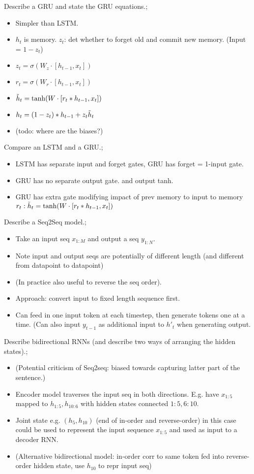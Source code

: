 \documentclass{article}
\begin{document}
Describe a GRU and state the GRU equations.; \begin{itemize}
    \item Simpler than LSTM. 
    \item $h_t$ is memory. $z_t$: det whether to forget old and commit new memory. (Input = $1-z_t$)
    \item $z_t = \sigma(W_z \cdot [h_{t-1}, x_t])$
    \item $r_t = \sigma(W_r \cdot [h_{t-1}, x_t])$
    \item $\Tilde{h}_t = \tanh(W\cdot [r_t * h_{t-1}, x_t])$
    \item $h_t = (1-z_t)*h_{t-1} + z_t \Tilde{h}_t$
    \item (todo: where are the biases?)
\end{itemize}

Compare an LSTM and a GRU.; \begin{itemize}
    \item LSTM has separate input and forget gates, GRU has forget = 1-input gate.
    \item GRU has no separate output gate. and output tanh.
    \item GRU has extra gate modifying impact of prev memory to input to memory $r_t: \Tilde{h}_t = \tanh(W\cdot [r_t * h_{t-1}, x_t])$
\end{itemize}

Describe a Seq2Seq model.; \begin{itemize}
    \item Take an input seq $x_{1:M}$ and output a seq $y_{1:N}$. 
    \item Note input and output seqs are potentially of different length (and different from datapoint to datapoint)
    \item (In practice also useful to reverse the seq order).
    \item Approach: convert input to fixed length sequence first.
    \item Can feed in one input token at each timestep, then generate tokens one at a time. (Can also input $y_{t-1}$ as additional input to $h'_t$ when generating output.
\end{itemize}

Describe bidirectional RNNs (and describe two ways of arranging the hidden states).; \begin{itemize}
    \item (Potential criticism of Seq2seq: biased towards capturing latter part of the sentence.)
    \item Encoder model traverses the input seq in both directions. E.g. have $x_{1:5}$ mapped to $h_{1:5}, h_{10:6}$ with hidden states connected $1:5, 6:10$. 
    \item Joint state e.g. $(h_5, h_{10})$ (end of in-order and reverse-order) in this case could be used to represent the input sequence $x_{1:5}$ and used as input to a decoder RNN.
    \item (Alternative bidirectional model: in-order corr to same token fed into reverse-order hidden state, use $h_{10}$ to repr input seq)
\end{itemize}
\end{document}
